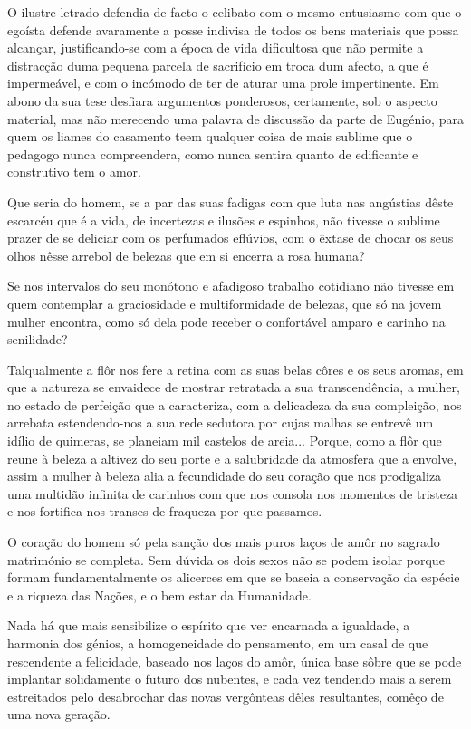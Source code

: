 \documentclass[9pt]{article}
\begin{document}
O ilustre letrado defendia de-facto o celibato com o mesmo entusiasmo
com que o egoísta defende avaramente a posse indivisa de todos os bens
materiais que possa alcan\-çar, justifi\-cando-se com a época de vida dificultosa
que não permite a distrac\-ção duma pequena parcela de sacrifício em troca
dum afecto, a que é impermeável, e com o incómodo de ter de aturar uma prole
impertinente. Em abono da sua tese desfiara argumentos ponderosos, certamente, sob o aspecto material, mas não merecendo uma palavra de discussão da parte de Eugé\-nio, para quem os liames do casamento teem qualquer coisa de mais
sublime que o pedagogo nunca compreendera, como nunca sentira quanto de edifi\-cante e construtivo tem o amor.

Que seria do homem, se a par das suas fadigas com que luta nas
angústias dêste escarcéu que é a vida, de incertezas e ilusões e espinhos, não tivesse o sublime prazer de se deliciar com os perfumados
eflúvios, com o êxtase de chocar os seus o\-lhos nêsse arrebol de belezas que em si encerra a rosa humana?

Se nos intervalos do seu monótono e afadigoso traba\-lho cotidiano
não tivesse em quem contemplar a graciosidade e multiformidade de
belezas, que só na jovem mu\-lher encontra, como só dela pode receber o
confortável amparo e carinho na senilidade?

Talqualmente a flôr nos fere a retina com as suas belas côres e os
seus aromas, em que a natureza se envaidece de mostrar retratada a
sua transcendên\-cia, a mu\-lher, no estado de perfei\-ção que a  ca\-ra\-cte\-ri\-za,
com a delicadeza da sua complei\-ção, nos arrebata estendendo-nos a sua
rede sedutora por cujas ma\-lhas se entrevê um idílio de quimeras, se
planeiam mil castelos de areia... Porque, como a flôr que reune à beleza a altivez do seu porte e a salubridade da atmosfera que a envolve, assim a mu\-lher à beleza alia a fecundidade do seu cora\-ção que nos
prodigaliza uma multidão infinita de carinhos com que nos consola
nos momentos de tristeza e nos fortifi\-ca nos transes de fraqueza
por que passamos.

O cora\-ção do homem só pela san\-ção dos mais puros laços de amôr no sagrado matrimónio se
completa. Sem dúvida os dois sexos não se
podem isolar porque formam fundamentalmente os alicerces em que se
baseia a conserva\-ção da espécie e a riqueza das Na\-ções, e o bem estar
da Humanidade.

Nada há que mais  sensibilize o espírito que ver encarnada a
igualdade, a harmonia dos gé\-nios, a homogeneidade do pensamento, em um
casal de que rescendente a felicidade, baseado nos laços do amôr, única base sôbre que se pode implantar solidamente o futuro dos nubentes, e
cada vez tendendo mais a serem estreitados pelo desabrochar das novas
vergônteas dêles resultantes, comêço de uma nova gera\-ção.
\end{document}
